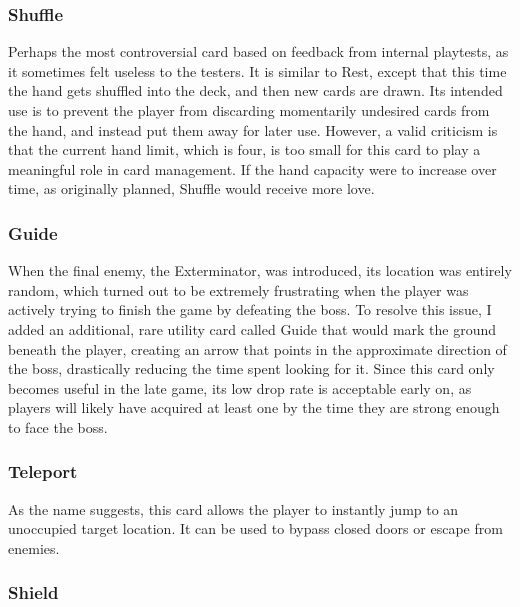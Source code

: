 \subsubsection{Shuffle}

Perhaps the most controversial card based on feedback from internal playtests, as it sometimes felt useless to the testers. It is similar to Rest, except that this time the hand gets shuffled into the deck, and then new cards are drawn. Its intended use is to prevent the player from discarding momentarily undesired cards from the hand, and instead put them away for later use. However, a valid criticism is that the current hand limit, which is four, is too small for this card to play a meaningful role in card management. If the hand capacity were to increase over time, as originally planned, Shuffle would receive more love.



\subsubsection{Guide}

When the final enemy, the Exterminator, was introduced, its location was entirely random, which turned out to be extremely frustrating when the player was actively trying to finish the game by defeating the boss. To resolve this issue, I added an additional, rare utility card called Guide that would mark the ground beneath the player, creating an arrow that points in the approximate direction of the boss, drastically reducing the time spent looking for it. Since this card only becomes useful in the late game, its low drop rate is acceptable early on, as players will likely have acquired at least one by the time they are strong enough to face the boss.



\subsubsection{Teleport}

As the name suggests, this card allows the player to instantly jump to an unoccupied target location. It can be used to bypass closed doors or escape from enemies.



\subsubsection{Shield}

